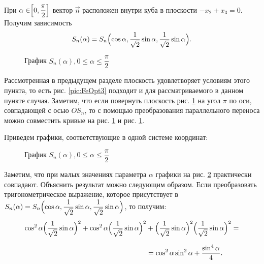 \documentclass[12pt,a4paper]{article}
\newcommand{\picref}[1]{рис. \ref{#1}}
\begin{document}
 При $\alpha \in \Bigr[ 0, \dfrac{\pi}{2} \Bigl]$ вектор $ \vec n $ расположен внутри куба в плоскости $ -x_2 + x_3 = 0 $. Получим зависимость 
 \[
	S_n(\alpha) = S_n \Bigl( \cos \alpha, \dfrac{1}{\sqrt 2} \sin \alpha, \dfrac{1}{\sqrt 2} \sin \alpha \Bigr).
 \] 

 \begin{figure}[h]
	\caption{График $S_n(\alpha), 0 \leq \alpha \leq \dfrac{\pi}{2}$}
	\label{pic:FeOpt4}
\end{figure}

 Рассмотренная в предыдущем разделе плоскость удовлетворяет условиям этого пункта, то есть \picref{pic:FeOpt3} подходит и для рассматриваемого в данном пункте случая. Заметим, что если повернуть плоскость \picref{pic:FeOpt4} на угол $\pi$ по оси, совпадающей с осью $OS_n$, то с помощью преобразования параллельного переноса можно совместить кривые на \picref{pic:FeOpt4} и \picref{pic:FeOpt4}.

 Приведем графики, соответствующие в одной системе координат: 
 
 \begin{figure}[h]
	\caption{График $S_n(\alpha), 0 \leq \alpha \leq \dfrac{\pi}{2}$}
	\label{pic:FeOpt5}
\end{figure}

 Заметим, что при малых значениях параметра $\alpha$ графики на \picref{pic:FeOpt5} практически совпадают. Объяснить результат можно следующим образом. Если преобразовать тригонометрическое выражение, которое присутствует в $S_n(\alpha) = S_n \Bigl( \cos \alpha, \dfrac{1}{\sqrt 2} \sin \alpha, \dfrac{1}{\sqrt 2} \sin \alpha \Bigr)$, то получим:
 \[
	\begin{split}
	\cos^2 \alpha \Bigl( \dfrac{1}{\sqrt 2} \sin \alpha \Bigr)^2 + \cos^2 \alpha \Bigl( \dfrac{1}{\sqrt 2} \sin \alpha \Bigr)^2 &+ \Bigl( \dfrac{1}{\sqrt 2} \sin \alpha \Bigr)^2 \Bigl( \dfrac{1}{\sqrt 2} \sin \alpha \Bigr)^2 = \\[0.7em]
	& = \cos^2 \alpha \sin^ 2 \alpha + \dfrac{\sin^4 \alpha}{4}.
	\end{split}
 \]
\end{document}

